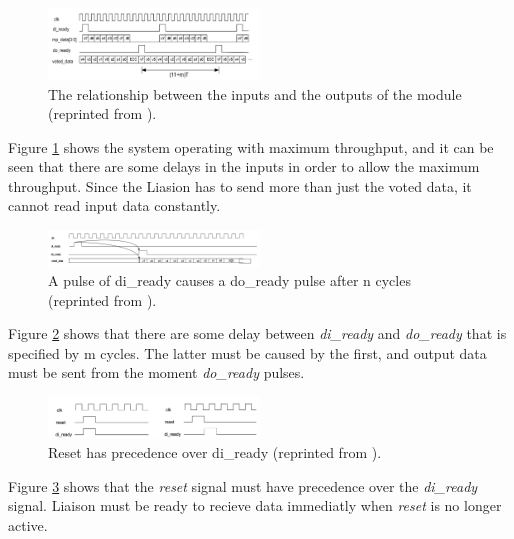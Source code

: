 \documentclass[a4paper]{IEEEtran}
\begin{document}
\begin{figure}[h!]
    \centering
    \includegraphics[width=0.5\textwidth]{Figures/ProjectDescription/LiaisonInputOutput}
    \caption{The relationship between the inputs and the outputs of the module (reprinted from \protect\cite{assignment-text}).}
    \label{fig:LiaisonInputOutput}
\end{figure}

Figure \ref{fig:LiaisonInputOutput} shows the system operating with maximum throughput, and it can be seen that there are some delays in the inputs in order to allow the maximum throughput.
Since the Liasion has to send more than just the voted data, it cannot read input data constantly.

\begin{figure}[h!]
    \centering
    \includegraphics[width=0.5\textwidth]{Figures/ProjectDescription/LiaisonDiReadyDoReady}
    \caption{A pulse of di\_ready causes a do\_ready pulse after n cycles (reprinted from \protect\cite{assignment-text}).}
    \label{fig:LiaisonDiReadyDoReady}
\end{figure}

Figure \ref{fig:LiaisonDiReadyDoReady} shows that there are some delay between \textit{di\_ready} and \textit{do\_ready} that is specified by m cycles.
The latter must be caused by the first, and output data must be sent from the moment \textit{do\_ready} pulses.

\begin{figure}[h!]
    \centering
    \includegraphics[width=0.5\textwidth]{Figures/ProjectDescription/LiaisonResetDiReady}
    \caption{Reset has precedence over di\_ready (reprinted from \protect\cite{assignment-text}).}
    \label{fig:LiaisonResetDiReady}
\end{figure}

Figure \ref{fig:LiaisonResetDiReady} shows that the \textit{reset} signal must have precedence over the \textit{di\_ready} signal. Liaison must be ready to recieve data immediatly when \textit{reset} is no longer active.
\end{document}
